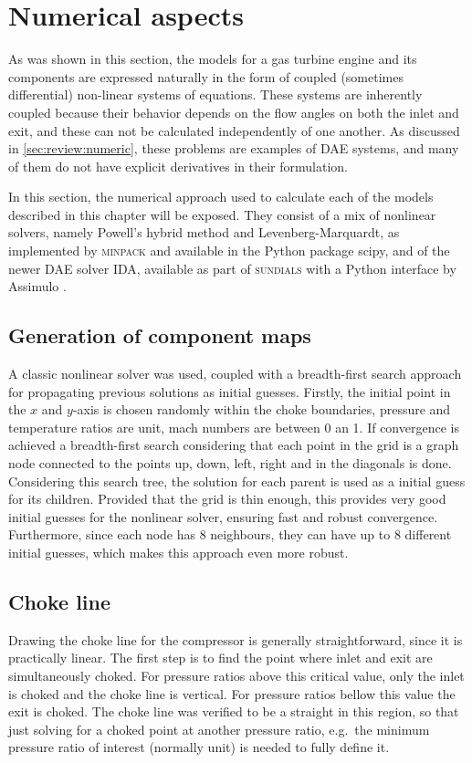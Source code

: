 \documentclass[tcc]{subfiles}
\begin{document}
\section{Numerical aspects}

As was shown in this section, the models for a gas turbine engine and its components are expressed naturally in the form of coupled (sometimes differential) non-linear systems of equations. 
These systems are inherently coupled because their behavior depends on the flow angles on both the inlet and exit, and these can not be calculated independently of one another.
As discussed in \cref{sec:review:numeric}, these problems are examples of \ac{DAE} systems, and many of them do not have explicit derivatives in their formulation.

In this section, the numerical approach used to calculate each of the models described in this chapter will be exposed. They consist of a mix of nonlinear solvers, namely Powell's hybrid method and Levenberg-Marquardt, as implemented by \textsc{minpack} and available in the Python package scipy, and of the newer \ac{DAE} solver \textsc{IDA}, available as part of \textsc{sundials} \cite{sundials} with a Python interface by Assimulo \cite{assimulo}.

\subsection{Generation of component maps}
A classic nonlinear solver was used, coupled with a breadth-first search approach for propagating previous solutions as initial guesses. 
Firstly, the initial point in the $x$ and $y$-axis is chosen randomly within the choke boundaries, 
pressure and temperature ratios are unit, mach numbers are between 0 an 1. 
If convergence is achieved a breadth-first search considering that each point in the grid is a graph node connected to the points up, down, left, right and in the diagonals is done.
Considering this search tree, the solution for each parent is used as a initial guess for its children. Provided that the grid is thin enough, this provides very good initial guesses for the nonlinear solver, ensuring fast and robust convergence. Furthermore, since each node has 8 neighbours, they can have up to 8 different initial guesses, which makes this approach even more robust.

\subsection{Choke line}
Drawing the choke line for the compressor is generally straightforward, since it is practically linear. The first step is to find the point where inlet and exit are simultaneously choked. For pressure ratios above this critical value, only the inlet is choked and the choke line is vertical. For pressure ratios bellow this value the exit is choked. The choke line was verified to be a straight in this region, so that just solving for a choked point at another pressure ratio, e.g.\ the minimum pressure ratio of interest (normally unit) is needed to fully define it.
\end{document}
